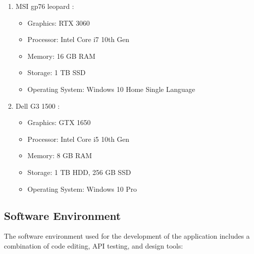 \begin{enumerate}
    \item MSI gp76 leopard :
          \begin{itemize}
              \item Graphics: RTX 3060
              \item Processor: Intel Core i7 10th Gen
              \item Memory: 16 GB RAM
              \item Storage: 1 TB SSD
              \item Operating System: Windows 10 Home Single Language
          \end{itemize}
    \item Dell G3 1500 :
          \begin{itemize}
              \item Graphics: GTX 1650
              \item  Processor: Intel Core i5 10th Gen
              \item Memory: 8 GB RAM
              \item Storage: 1 TB HDD, 256 GB SSD
              \item Operating System: Windows 10 Pro
          \end{itemize}
\end{enumerate}

\newpage
\subsection{Software Environment}
The software environment used for the development of the application includes a combination of code editing, API testing, and design tools:


